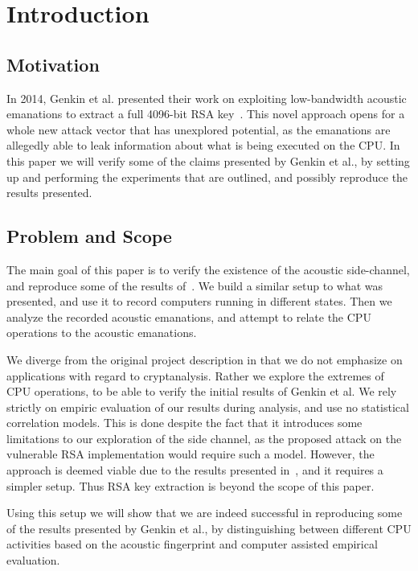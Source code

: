 \chapter{Introduction}\label{chp:introduction} 

\section{Motivation}
In 2014, Genkin et al. presented their work on exploiting low-bandwidth acoustic emanations to extract a full 4096-bit RSA key~\cite{DBLP:conf/crypto/GenkinST14}.
This novel approach opens for a whole new attack vector that has unexplored potential, as the emanations are allegedly able to leak information about what is being executed on the CPU.
In this paper we will verify some of the claims presented by Genkin et al., by setting up and performing the experiments that are outlined, and possibly reproduce the results presented.


\section{Problem and Scope}
The main goal of this paper is to verify the existence of the acoustic side-channel, and reproduce some of the results of~\cite{DBLP:conf/crypto/GenkinST14}.
We build a similar setup to what was presented, and use it to record computers running in different states.
Then we analyze the recorded acoustic emanations, and attempt to relate the CPU operations to the acoustic emanations.

We diverge from the original project description in that we do not emphasize on applications with regard to cryptanalysis.
Rather we explore the extremes of CPU operations, to be able to verify the initial results of Genkin et al.
We rely strictly on empiric evaluation of our results during analysis, and use no statistical correlation models.
This is done despite the fact that it introduces some limitations to our exploration of the side channel, as the proposed attack on the vulnerable RSA implementation would require such a model.
However, the approach is deemed viable due to the results presented in~\cite{DBLP:conf/crypto/GenkinST14}, and it requires a simpler setup.
Thus RSA key extraction is beyond the scope of this paper.

Using this setup we will show that we are indeed successful in reproducing some of the results presented by Genkin et al., by distinguishing between different CPU activities based on the acoustic fingerprint and computer assisted empirical evaluation.

